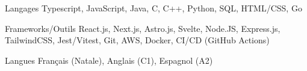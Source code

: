 
\begin{cvskills}
  \cvskill
    {Langages} %
    {Typescript, JavaScript, Java, C, C++, Python, SQL, HTML/CSS, Go} %

  \cvskill
    {Frameworks/Outils} %
    {React.js, Next.js, Astro.js, Svelte, Node.JS, Express.js, TailwindCSS, Jest/Vitest, Git, AWS, Docker, CI/CD (GitHub Actions)} %
    
  \cvskill
    {Langues} %
    {Français (Natale), Anglais (C1), Espagnol (A2)} %
    
\end{cvskills}
